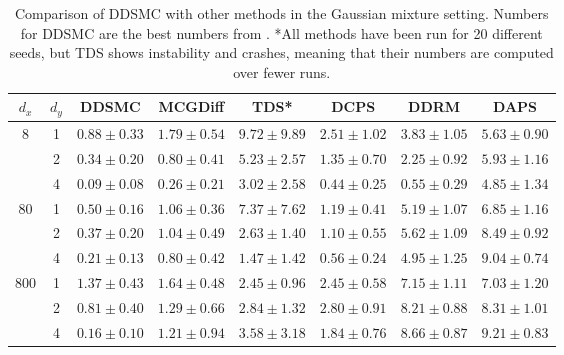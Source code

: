 \begin{table*}[tb!]
\caption{Comparison of DDSMC with other methods in the Gaussian mixture setting. Numbers for DDSMC are the best numbers from . *All methods have been run for 20 different seeds, but TDS shows instability and crashes, meaning that their numbers are computed over fewer runs.}
\label{tab:gmm-table-other}
\vskip 0.15in
\begin{center}
\begin{small}
\begin{sc}
\begin{tabular}{cccccccc}
\toprule
$d_x$                & $d_y$ & DDSMC              & MCGDiff       &  TDS*            & DCPS           & DDRM         & DAPS  \\
\midrule
\multirow{3}{*}{8}   & 1     & $0.88\pm0.33$      & $1.79\pm0.54$ & $9.72\pm9.89$  & $2.51\pm1.02$  & $3.83\pm1.05$ & $5.63\pm0.90$ \\
                     & 2     & $0.34\pm0.20$      & $0.80\pm0.41$ & $5.23\pm2.57$   & $1.35\pm0.70$  & $2.25\pm0.92$ & $5.93\pm1.16$ \\
                     & 4     & $0.09\pm0.08$      & $0.26\pm0.21$ & $3.02\pm2.58$   & $0.44\pm0.25$  & $0.55\pm0.29$ & $4.85\pm1.34$ \\ \midrule
\multirow{3}{*}{80}  & 1     & $0.50\pm0.16$      & $1.06\pm0.36$ & $7.37\pm7.62$   & $1.19\pm0.41$  & $5.19\pm1.07$ & $6.85\pm1.16$ \\
                     & 2     & $0.37\pm0.20$      & $1.04\pm0.49$ & $2.63\pm1.40$   & $1.10\pm0.55$  & $5.62\pm1.09$ & $8.49\pm0.92$ \\
                     & 4     & $0.21\pm0.13$      & $0.80\pm0.42$ & $1.47\pm1.42$   & $0.56\pm0.24$  & $4.95\pm1.25$ & $9.04\pm0.74$ \\ \midrule
\multirow{3}{*}{800} & 1     & $1.37\pm0.43$      & $1.64\pm0.48$ & $2.45\pm0.96$   & $2.45\pm0.58$  & $7.15\pm1.11$ & $7.03\pm1.20$ \\
                     & 2     & $0.81\pm0.40$      & $1.29\pm0.66$ & $2.84\pm1.32$   & $2.80\pm0.91$  & $8.21\pm0.88$ & $8.31\pm1.01$ \\
                     & 4     & $0.16\pm0.10$      & $1.21\pm0.94$ & $3.58\pm3.18$   & $1.84\pm0.76$  & $8.66\pm0.87$ & $9.21\pm0.83$ \\
\bottomrule
\end{tabular}
\end{sc}
\end{small}
\end{center}
\vskip -0.1in
\end{table*}
